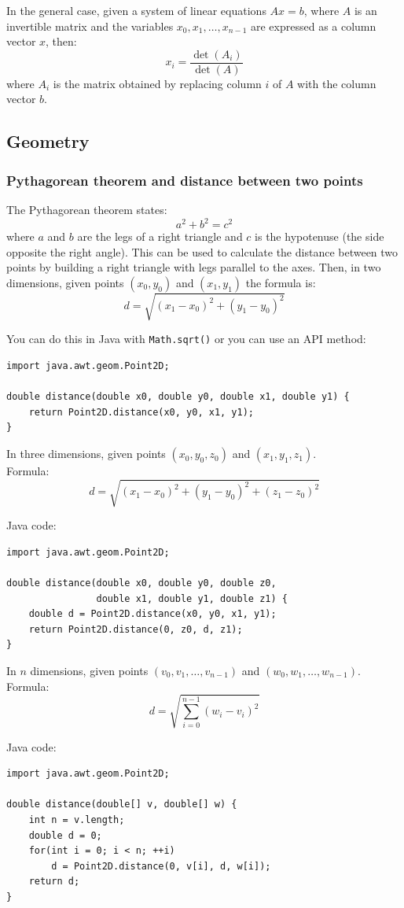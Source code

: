 \documentclass[a4paper,12pt]{article}
\begin{document}
\noindent In the general case, given a system of linear equations $Ax=b$, where $A$ is an invertible matrix and the variables $x_0,x_1,\ldots,x_{n-1}$ are expressed as a column vector $x$, then:
\[x_i=\frac{\det(A_i)}{\det(A)}\]
\noindent where $A_i$ is the matrix obtained by replacing column $i$ of $A$ with the column vector $b$.
\subsection{Geometry}
\subsubsection{Pythagorean theorem and distance between two points}
\noindent The Pythagorean theorem states:
\[a^2+b^2=c^2\]
\noindent where $a$ and $b$ are the legs of a right triangle and $c$ is the hypotenuse (the side opposite the right angle). This can be used to calculate the distance between two points by building a right triangle with legs parallel to the axes. Then, in two dimensions, given points $(x_0, y_0)$ and $(x_1, y_1)$ the formula is:
\[ d = \sqrt{(x_1 - x_0)^2 + (y_1 - y_0)^2} \]

\noindent You can do this in Java with \verb/Math.sqrt()/ or you can use an API method:
\begin{lstlisting}
import java.awt.geom.Point2D;

double distance(double x0, double y0, double x1, double y1) {
	return Point2D.distance(x0, y0, x1, y1);
}
\end{lstlisting}

\noindent In three dimensions, given points $(x_0, y_0, z_0)$ and $(x_1, y_1, z_1)$. \\ Formula:
\[ d = \sqrt{(x_1 - x_0)^2 + (y_1 - y_0)^2 + (z_1 - z_0)^2} \]

\noindent Java code:
\begin{lstlisting}
import java.awt.geom.Point2D;

double distance(double x0, double y0, double z0,
                double x1, double y1, double z1) {
	double d = Point2D.distance(x0, y0, x1, y1);
	return Point2D.distance(0, z0, d, z1);
}
\end{lstlisting}

\noindent In $n$ dimensions, given points $(v_0, v_1, \ldots, v_{n-1})$ and $(w_0, w_1, \ldots, w_{n-1})$. \\ Formula:
\[ d = \sqrt{\sum_{i=0}^{n-1}{(w_i - v_i)^2}} \]

\noindent Java code:
\begin{lstlisting}
import java.awt.geom.Point2D;

double distance(double[] v, double[] w) {
	int n = v.length;
	double d = 0;
	for(int i = 0; i < n; ++i)
		d = Point2D.distance(0, v[i], d, w[i]);
	return d;
}
\end{lstlisting}
\end{document}

